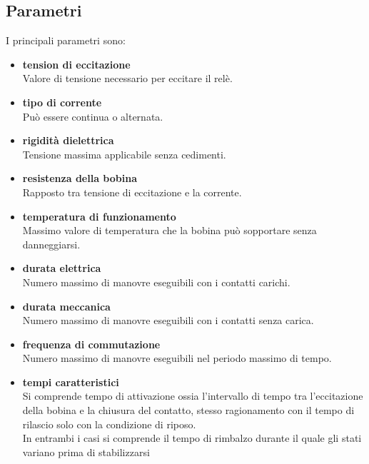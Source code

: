\documentclass{article}
\begin{document}
\subsection{Parametri}
I principali parametri sono:
\begin{itemize}
    \item \textbf{tension di eccitazione}\\
    Valore di tensione necessario per eccitare il relè.
    \item \textbf{tipo di corrente }\\
    Può essere continua o alternata.
    \item \textbf{rigidità dielettrica}\\
    Tensione massima applicabile senza cedimenti.
    \item \textbf{resistenza della bobina}\\
    Rapposto tra tensione di eccitazione e la corrente.
    \item \textbf{temperatura di funzionamento}\\
    Massimo valore di temperatura che la bobina può sopportare senza danneggiarsi.
    \item \textbf{durata elettrica}\\
    Numero massimo di manovre eseguibili con i contatti carichi.
    \item \textbf{durata meccanica}\\
    Numero massimo di manovre eseguibili con i contatti senza carica.
    \item \textbf{frequenza di commutazione}\\
    Numero massimo di manovre eseguibili nel periodo massimo di tempo.
    \item \textbf{tempi caratteristici}\\
    Si comprende tempo di attivazione ossia l'intervallo di tempo tra l'eccitazione della bobina e la chiusura del contatto, 
    stesso ragionamento con il tempo di rilascio solo con la condizione di riposo.\\
    In entrambi i casi si comprende il tempo di rimbalzo durante il quale gli stati variano prima di stabilizzarsi
\end{itemize}
\end{document}
